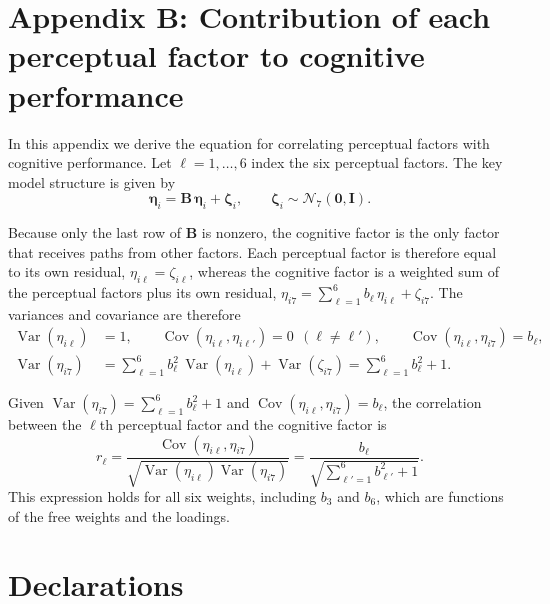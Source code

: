 \documentclass[
  ,man]{apa6}
\begin{document}
\section{Appendix B: Contribution of each perceptual factor to cognitive performance}\label{appendix-b-contribution-of-each-perceptual-factor-to-cognitive-performance}

In this appendix we derive the equation for correlating perceptual factors with cognitive performance. Let \(\ell = 1, \ldots, 6\) index the six perceptual factors. The key model structure is given by \[\boldsymbol{\eta}_i = \mathbf{B}\,\boldsymbol{\eta}_i + \boldsymbol{\zeta}_i, \qquad \boldsymbol{\zeta}_i \sim \mathcal{N}_{7}\!\left(\mathbf{0}, \mathbf{I}\right).\]

Because only the last row of \(\mathbf{B}\) is nonzero, the cognitive factor is the only factor that receives paths from other factors. Each perceptual factor is therefore equal to its own residual, \(\eta_{i\ell} = \zeta_{i\ell}\), whereas the cognitive factor is a weighted sum of the perceptual factors plus its own residual, \(\eta_{i7} = \sum_{\ell=1}^{6} b_\ell\,\eta_{i\ell} + \zeta_{i7}\). The variances and covariance are therefore
\[
\begin{aligned}
\operatorname{Var}(\eta_{i\ell}) &= 1, \qquad
\operatorname{Cov}(\eta_{i\ell}, \eta_{i\ell'}) = 0 \ \ (\ell \neq \ell'), \qquad
\operatorname{Cov}(\eta_{i\ell}, \eta_{i7}) = b_\ell, \\
\operatorname{Var}(\eta_{i7}) &= \sum_{\ell=1}^{6} b_\ell^2\,\operatorname{Var}(\eta_{i\ell}) + \operatorname{Var}(\zeta_{i7}) = \sum_{\ell=1}^{6} b_\ell^2 + 1.
\end{aligned}
\]

Given \(\operatorname{Var}(\eta_{i7}) = \sum_{\ell=1}^{6} b_\ell^2 + 1\) and \(\operatorname{Cov}(\eta_{i\ell}, \eta_{i7}) = b_\ell\), the correlation between the \(\ell\)th perceptual factor and the cognitive factor is
\[
r_\ell = \frac{\operatorname{Cov}(\eta_{i\ell}, \eta_{i7})}{\sqrt{\operatorname{Var}(\eta_{i\ell})\operatorname{Var}(\eta_{i7})}}
= \frac{b_\ell}{\sqrt{\sum_{\ell'=1}^{6} b_{\ell'}^2 + 1}}.
\]
This expression holds for all six weights, including \(b_3\) and \(b_6\), which are functions of the free weights and the loadings.
\newpage

\section{Declarations}\label{declarations}
\end{document}
